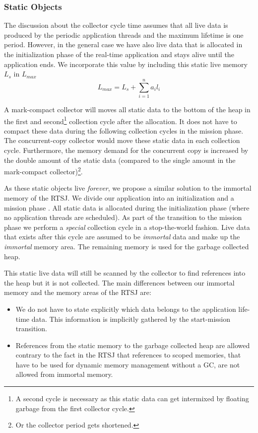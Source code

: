 \subsubsection{Static Objects}

The discussion about the collector cycle time assumes that all live
data is produced by the periodic application threads and the maximum
lifetime is one period. However, in the general case we have also
live data that is allocated in the initialization phase of the
real-time application and stays alive until the application ends. We
incorporate this value by including this static live memory $L_s$ in
$L_{max}$
\begin{equation}
    L_{max} = L_s + \sum_{i=1}^{n} a_i l_i
\end{equation}


A mark-compact collector will moves all static data to the bottom of
the heap in the first and second\footnote{A second cycle is
necessary as this static data can get intermixed by floating garbage
from the first collector cycle.} collection cycle after the
allocation. It does not have to compact these data during the
following collection cycles in the mission phase. The
concurrent-copy collector would move these static data in each
collection cycle. Furthermore, the memory demand for the concurrent
copy is increased by the double amount of the static data (compared
to the single amount in the mark-compact collector)\footnote{Or the
collector period gets shortened.}.

As these static objects live \emph{forever}, we propose a similar
solution to the immortal memory of the RTSJ. We divide our
application into an initialization and a mission phase
\cite{Pusch01}. All static data is allocated during the
initialization phase (where no application threads are scheduled).
As part of the transition to the mission phase we perform a
\emph{special} collection cycle in a stop-the-world fashion. Live
data that exists after this cycle are assumed to be \emph{immortal}
data and make up the \emph{immortal} memory area. The remaining
memory is used for the garbage collected heap.

This static live data will still be scanned by the collector to find
references into the heap but it is not collected. The main
differences between our immortal memory and the memory areas of the
RTSJ are:
\begin{itemize}
    \item We do not have to state explicitly which data belongs to
    the application life-time data. This information is implicitly gathered
    by the start-mission transition.
    \item References from the static memory to the garbage collected
    heap are allowed contrary to the fact in the RTSJ that references to scoped
    memories, that have to be used for dynamic memory management
    without a GC, are not allowed from immortal memory.
\end{itemize}

